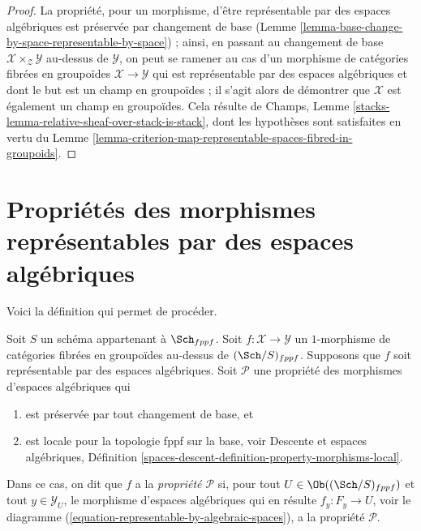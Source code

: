 \begin{proof}
La propriété, pour un morphisme, d'être représentable par des espaces algébriques
est préservée par changement de base
(Lemme \ref{lemma-base-change-by-space-representable-by-space}) ;
ainsi, en passant au changement de base
$\mathcal{X} \times_\mathcal{Z} \mathcal{Y}$ au-dessus de $\mathcal{Y}$,
on peut se ramener au cas d'un morphisme de catégories
fibrées en groupoïdes $\mathcal{X} \to \mathcal{Y}$
qui est représentable par des espaces algébriques et
dont le but est un champ en groupoïdes ; il s'agit alors de démontrer
que $\mathcal{X}$ est également un champ en groupoïdes.
Cela résulte de Champs, Lemme
\ref{stacks-lemma-relative-sheaf-over-stack-is-stack},
dont les hypothèses sont satisfaites en vertu du
Lemme \ref{lemma-criterion-map-representable-spaces-fibred-in-groupoids}.
\end{proof}







\section{Propriétés des morphismes représentables par des espaces algébriques}
\label{section-representable-properties}

\noindent
Voici la définition qui permet de procéder.

\begin{definition}
\label{definition-relative-representable-property}
Soit $S$ un schéma appartenant à $\Sch_{fppf}$.
Soit $f : \mathcal{X} \to \mathcal{Y}$ un $1$-morphisme
de catégories fibrées en groupoïdes au-dessus de $(\Sch/S)_{fppf}$.
Supposons que $f$ soit représentable par des espaces algébriques.
Soit $\mathcal{P}$ une propriété des morphismes d'espaces algébriques qui
\begin{enumerate}
\item est préservée par tout changement de base, et
\item est locale pour la topologie fppf sur la base, voir
Descente et espaces algébriques,
Définition \ref{spaces-descent-definition-property-morphisms-local}.
\end{enumerate}
Dans ce cas, on dit que $f$ a la {\it propriété $\mathcal{P}$} si, pour tout
$U \in \Ob((\Sch/S)_{fppf})$ et
tout $y \in \mathcal{Y}_U$, le morphisme d'espaces algébriques qui en résulte
$f_y : F_y \to U$, voir le
diagramme (\ref{equation-representable-by-algebraic-spaces}),
a la propriété $\mathcal{P}$.
\end{definition}


